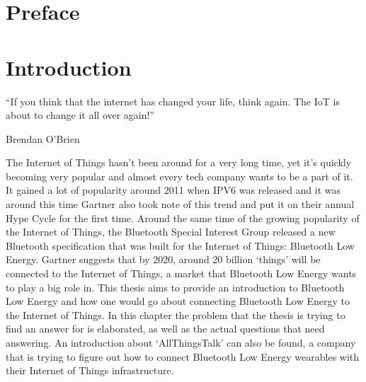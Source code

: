 \documentclass[pdftex,a4paper,12pt,twoside]{report}
\begin{document}
\begin{abstract}
\end{abstract}

\chapter*{Preface}
\label{ch:preface}


\tableofcontents



\chapter{Introduction}
\label{ch:introduction}
\epigraph{``If you think that the internet has changed your life, think again. The IoT is about to change it all over again!''}{Brendan O'Brien}
The Internet of Things hasn't been around for a very long time, yet it's quickly becoming very popular and almost every tech company wants to be a part of it. It gained a lot of popularity around 2011 when IPV6 was released and it was around this time Gartner also took note of this trend and put it on their annual Hype Cycle for the first time. Around the same time of the growing popularity of the Internet of Things, the Bluetooth Special Interest Group released a new Bluetooth specification that was built for the Internet of Things: Bluetooth Low Energy. Gartner suggests that by 2020, around 20 billion `things' will be connected to the Internet of Things, a market that Bluetooth Low Energy wants to play a big role in. This thesis aims to provide an introduction to Bluetooth Low Energy and how one would go about connecting Bluetooth Low Energy to the Internet of Things. In this chapter the problem that the thesis is trying to find an answer for is elaborated, as well as the actual questions that need answering. An introduction about `AllThingsTalk' can also be found, a company that is trying to figure out how to connect Bluetooth Low Energy wearables with their Internet of Things infrastructure.
\end{document}
